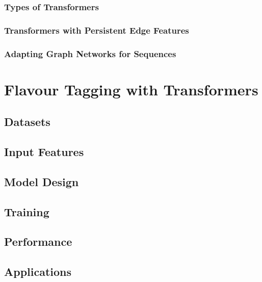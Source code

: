 \subsection{Types of Transformers}

\subsection{Transformers with Persistent Edge Features}

\subsection{Adapting Graph Networks for Sequences}

\chapter{Flavour Tagging with Transformers}

\section{Datasets}

\section{Input Features}

\section{Model Design}

\section{Training}

\section{Performance}

\section{Applications}










